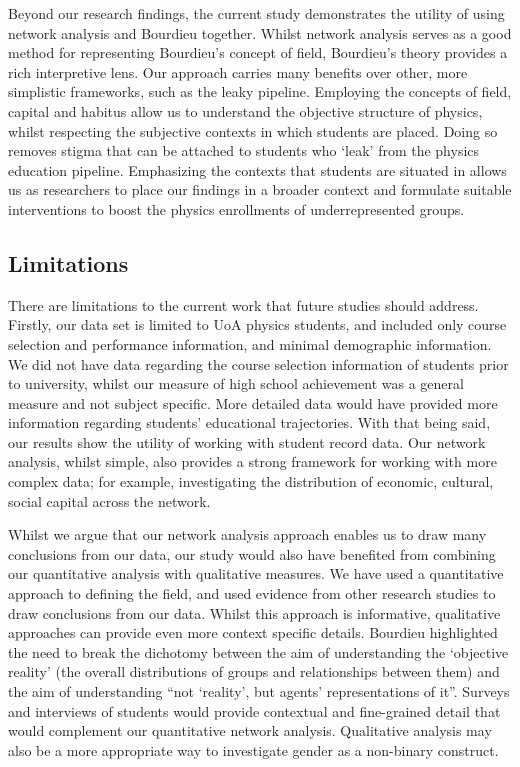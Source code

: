 Beyond our research findings, the current study demonstrates the utility of using network analysis and Bourdieu together. Whilst network analysis serves as a good method for representing Bourdieu's concept of field, Bourdieu's theory provides a rich interpretive lens. Our approach carries many benefits over other, more simplistic frameworks, such as the leaky pipeline. Employing the concepts of field, capital and habitus allow us to understand the objective structure of physics, whilst respecting the subjective contexts in which students are placed. Doing so removes stigma that can be attached to students who `leak' from the physics education pipeline. Emphasizing the contexts that students are situated in allows us as researchers to place our findings in a broader context and formulate suitable interventions to boost the physics enrollments of underrepresented groups. 

\subsection*{Limitations}
There are limitations to the current work that future studies should address. Firstly, our data set is limited to UoA physics students, and included only course selection and performance information, and minimal demographic information. We did not have data regarding the course selection information of students prior to university, whilst our measure of high school achievement was a general measure and not subject specific. More detailed data would have provided more information regarding students' educational trajectories. With that being said, our results show the utility of working with student record data. Our network analysis, whilst simple, also provides a strong framework for working with more complex data; for example, investigating the distribution of economic, cultural, social capital across the network.

Whilst we argue that our network analysis approach enables us to draw many conclusions from our data, our study would also have benefited from combining our quantitative analysis with qualitative measures. We have used a quantitative approach to defining the field, and used evidence from other research studies to draw conclusions from our data. Whilst this approach is informative, qualitative approaches can provide even more context specific details. Bourdieu highlighted the need to break the dichotomy between the aim of understanding the `objective reality' (the overall distributions of groups and relationships between them) and the aim of understanding ``not `reality', but agents' representations of it''.\cite{Bourdieu_1986} Surveys and interviews of students would provide contextual and fine-grained detail that would complement our quantitative network analysis. Qualitative analysis may also be a more appropriate way to investigate gender as a non-binary construct.  

